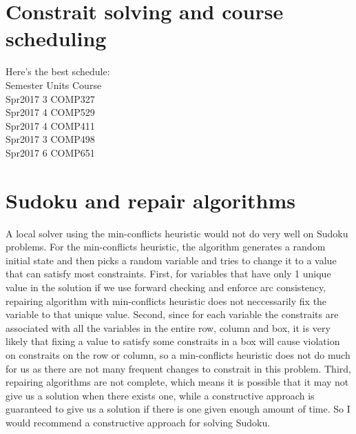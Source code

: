 \documentclass[11pt]{article}
\begin{document}
\begin{onehalfspace}
\section{Constrait solving and course scheduling}
Here's the best schedule:        \\
Semester		Units	Course  \\
  Spr2017	3	COMP327     \\
  Spr2017	4	COMP529     \\
  Spr2017	4	COMP411     \\
  Spr2017	3	COMP498     \\
  Spr2017	6	COMP651     \\
\section{Sudoku and repair algorithms}
A local solver using the min-conflicts heuristic would not do very well on Sudoku problems. For the min-conflicts heuristic, the algorithm generates a random initial state and then picks a random variable and tries to change it to a value that can satisfy most constraints. First, for variables that have only 1 unique value in the solution if we use forward checking and enforce arc consistency, repairing algorithm with min-conflicts heuristic does not neccessarily fix the variable to that unique value. Second, since for each variable the constraits are associated with all the variables in the entire row, column and box, it is very likely that fixing a value to satisfy some constraits in a box will cause violation on constraits on the row or column, so a min-conflicts heuristic does not do much for us as there are not many frequent changes to constrait in this problem. Third, repairing algorithms are not complete, which means it is possible that it may not give us a solution when there exists one, while a constructive approach is guaranteed to give us a solution if there is one given enough amount of time. So I would recommend a constructive approach for solving Sudoku.
\end{onehalfspace}
\end{document}

